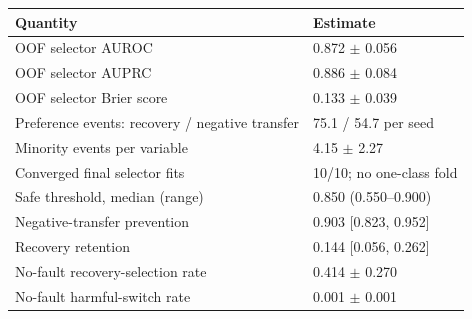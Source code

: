 \begin{tabular}{lp{}}
\toprule
Quantity & Estimate \\
\midrule
OOF selector AUROC & 0.872 $\pm$ 0.056 \\
OOF selector AUPRC & 0.886 $\pm$ 0.084 \\
OOF selector Brier score & 0.133 $\pm$ 0.039 \\
Preference events: recovery / negative transfer & 75.1 / 54.7 per seed \\
Minority events per variable & 4.15 $\pm$ 2.27 \\
Converged final selector fits & 10/10; no one-class fold \\
Safe threshold, median (range) & 0.850 (0.550--0.900) \\
Negative-transfer prevention & 0.903 [0.823, 0.952] \\
Recovery retention & 0.144 [0.056, 0.262] \\
No-fault recovery-selection rate & 0.414 $\pm$ 0.270 \\
No-fault harmful-switch rate & 0.001 $\pm$ 0.001 \\
\bottomrule
\end{tabular}
